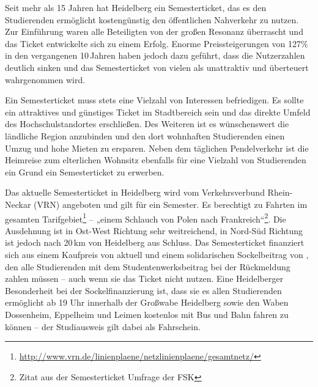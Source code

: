 % 
% 

Seit mehr als 15 Jahren hat Heidelberg ein Semesterticket, 
das es den Studierenden ermöglicht kostengünstig den öffentlichen
Nahverkehr zu nutzen.
Zur Einführung waren alle Beteiligten von der großen Resonanz überrascht
und das Ticket entwickelte sich zu einem Erfolg.
Enorme Preissteigerungen von 127\% in den vergangenen 10\,Jahren haben
jedoch dazu geführt, dass die Nutzerzahlen deutlich sinken und 
das Semesterticket von vielen als unattraktiv und überteuert wahrgenommen 
wird.

Ein Semesterticket muss stets eine Vielzahl von Interessen befriedigen. Es 
sollte ein attraktives und günstiges Ticket im Stadtbereich sein und das 
direkte Umfeld des Hochschulstandortes erschließen. Des Weiteren ist es wünschenswert die ländliche Region anzubinden und den dort wohnhaften Studierenden einen Umzug und hohe Mieten zu ersparen. Neben dem täglichen Pendelverkehr ist die Heimreise zum elterlichen Wohnsitz ebenfalls für eine Vielzahl von Studierenden ein Grund ein Semesterticket zu erwerben.

Das aktuelle Semesterticket in Heidelberg wird vom Verkehrsverbund Rhein-Neckar (VRN) angeboten und gilt für ein Semester. Es berechtigt zu Fahrten im gesamten Tarifgebiet\footnote{\url{http://www.vrn.de/linienplaene/netzlinienplaene/gesamtnetz/}} -- „einem Schlauch von Polen nach Frankreich“\footnote{Zitat aus der Semesterticket Umfrage der FSK}. Die Ausdehnung ist in Ost-West Richtung sehr weitreichend, in Nord-Süd Richtung ist jedoch nach 20\,km von Heidelberg aus Schluss. Das Semesterticket finanziert sich aus einem Kaufpreis von aktuell  und einem solidarischen Sockelbeitrag von , den alle Studierenden mit dem Studentenwerksbeitrag bei der Rückmeldung zahlen müssen -- auch wenn sie das Ticket nicht nutzen. Eine Heidelberger Besonderheit bei der Sockelfinanzierung ist, dass sie es allen Studierenden ermöglicht ab 19 Uhr innerhalb der Großwabe Heidelberg sowie den Waben Dossenheim, Eppelheim und Leimen kostenlos mit Bus und Bahn fahren zu können -- der Studiausweis gilt dabei als Fahrschein.


